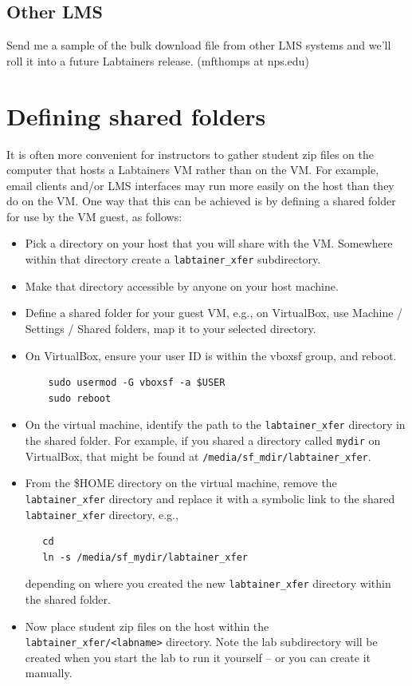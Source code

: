 \documentclass[12pt]{article}
\begin{document}
\begin{appendices}
\subsection{Other LMS}
Send me a sample of the bulk download file from other LMS systems and we'll roll it into a future Labtainers release. (mfthomps at nps.edu)

\newpage
\section{Defining shared folders}
\label{shared-directory}
It is often more convenient for instructors to gather student zip files on the computer that hosts a Labtainers
VM rather than on the VM.  For example, email clients and/or LMS interfaces may run more easily on the host than
they do on the VM.  One way that this can be achieved is by defining a shared folder for use by the VM guest, as follows:
\begin{itemize}
\item Pick a directory on your host that you will share with the VM. Somewhere within that directory create a
{\tt labtainer\_xfer} subdirectory.
\item Make that directory accessible by anyone on your host machine.  
\item Define a shared folder for your guest VM, e.g., on VirtualBox, use Machine / Settings / Shared folders, map it
to your selected directory.  
\item On VirtualBox, ensure your user ID is within the vboxsf group, and reboot.
\begin{verbatim}
    sudo usermod -G vboxsf -a $USER
    sudo reboot
\end{verbatim}
\item On the virtual machine, identify the path to the {\tt labtainer\_xfer} directory in the shared folder.  For example,
if you shared a directory called {\tt mydir} on VirtualBox, that might be found at {\tt /media/sf\_mdir/labtainer\_xfer}.
\item From the \$HOME directory on the virtual machine, remove the {\tt labtainer\_xfer} directory and replace it with
a symbolic link to the shared {\tt labtainer\_xfer} directory, e.g.,
\begin{verbatim}
   cd 
   ln -s /media/sf_mydir/labtainer_xfer
\end{verbatim}
\noindent depending on where you created the new {\tt labtainer\_xfer} directory within the shared folder.
\item Now place student zip files on the host within the {\tt labtainer\_xfer/<labname>} directory.  Note
the lab subdirectory will be created when you start the lab to run it yourself -- or you can create it manually.
\end{itemize}
\end{appendices}
\end{document}
